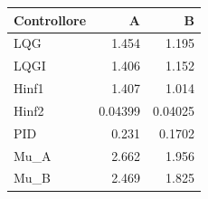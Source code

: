 \begin{tabular}{lrr}\toprule
Controllore & A & B\\\midrule
LQG & \num{1.454} & \num{1.195}\\
LQGI & \num{1.406} & \num{1.152}\\
Hinf1 & \num{1.407} & \num{1.014}\\
Hinf2 & \num{0.04399} & \num{0.04025}\\
PID & \num{0.231} & \num{0.1702}\\
Mu\_A & \num{2.662} & \num{1.956}\\
Mu\_B & \num{2.469} & \num{1.825}\\
\bottomrule\end{tabular}
